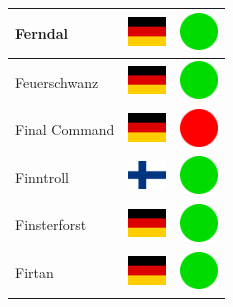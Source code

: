 \documentclass[12pt, a4paper, twoside]{report}
\begin{document}
\begin{center}
\begin{longtable}{|p{5cm}|p{2cm}|p{2cm}|}
 Ferndal                                                    & \includegraphics[width=1cm]{../img/flags/de} &   \includegraphics[width=1cm]{../likes/y} \\ \hline
 Feuerschwanz                                               & \includegraphics[width=1cm]{../img/flags/de} &   \includegraphics[width=1cm]{../likes/y} \\ \hline
 Final Command                                              & \includegraphics[width=1cm]{../img/flags/de} &   \includegraphics[width=1cm]{../likes/n} \\ \hline
 Finntroll                                                  & \includegraphics[width=1cm]{../img/flags/fi} &   \includegraphics[width=1cm]{../likes/y} \\ \hline
 Finsterforst                                               & \includegraphics[width=1cm]{../img/flags/de} &   \includegraphics[width=1cm]{../likes/y} \\ \hline
 Firtan                                                     & \includegraphics[width=1cm]{../img/flags/de} &   \includegraphics[width=1cm]{../likes/y} \\ \hline

\end{longtable}
\end{center}
\end{document}
